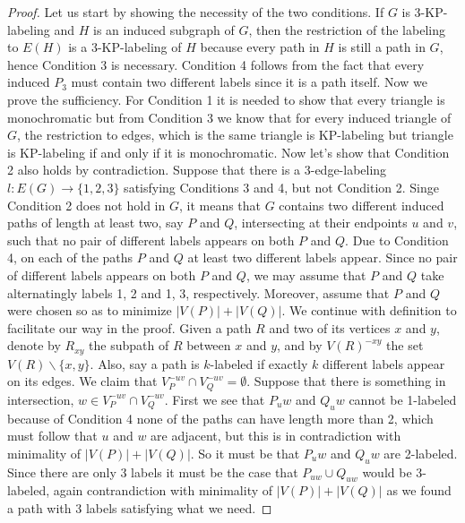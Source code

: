 \documentclass[12pt,a4paper,titlepage,openany]{report}
\begin{document}
\begin{proof}
Let us start by showing the necessity of the two conditions. If $G$ is 3-KP-labeling and $H$ is an induced subgraph of $G$, then the restriction of the labeling to $E(H)$ is a 3-KP-labeling of $H$ because every path in $H$ is still a path in $G$, hence Condition 3 is necessary. Condition 4 follows from the fact that every induced $P_3$ must contain two different labels since it is a path itself.\newline 
Now we prove the sufficiency. For Condition 1 it is needed to show that every triangle is monochromatic but from Condition 3 we know that for every induced triangle of $G$, the restriction to edges, which is the same triangle is KP-labeling but triangle is KP-labeling if and only if it is monochromatic.\newline
Now let's show that Condition 2 also holds by contradiction.\newline
Suppose  that there is a 3-edge-labeling $l:E(G)\rightarrow \{1,2,3\}$ satisfying Conditions 3 and 4, but not Condition 2. Singe Condition 2 does not hold in $G$, it means that $G$ contains two different induced paths of length at least two, say $P$ and $Q$, intersecting at their endpoints $u$ and $v$, such that no pair of different labels appears on both $P$ and $Q$.\newline
Due to Condition 4, on each of the paths $P$ and $Q$ at least two different labels appear. Since no pair of different labels appears on both $P$ and $Q$, we may assume that $P$ and $Q$ take alternatingly labels 1, 2 and 1, 3, respectively. Moreover, assume that $P$ and $Q$ were chosen so as to minimize $|V(P)|+|V(Q)|$.\newline
We continue with definition to facilitate our way in the proof. Given a path $R$ and two of its vertices $x$ and $y$, denote by $R_{xy}$ the subpath of $R$ between
$x$ and $y$, and by $V(R)^{-xy}$ the set $V(R)\backslash \{x,y\}$. Also, say a path is $k$-labeled if exactly $k$
different labels appear on its edges.\newline
We claim that $V_P^{−uv} \cap V_Q^{−uv} = \emptyset$. Suppose that there is something in intersection, $w\in V_P^{−uv} \cap V_Q^{−uv}$. First we see that $P_uw$ and $Q_uw$ cannot be 1-labeled because of Condition 4 none of the paths can have length more than 2, which must follow that $u$ and $w$ are adjacent, but this is in contradiction with minimality of $|V(P)|+|V(Q)|$. So it must be that $P_uw$ and $Q_uw$ are 2-labeled. Since there are only 3 labels it must be the case that $P_{uw}\cup Q_{uw}$ would be 3-labeled, again contrandiction with minimality of $|V(P)|+|V(Q)|$ as we found a path with 3 labels satisfying what we need. \newline

\end{proof}
\end{document}
